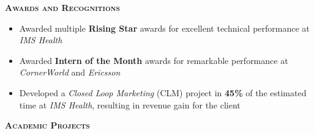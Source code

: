 \documentclass[11pt]{article}
\begin{document}
\begin{mdframed}[backgroundcolor=light-gray, linecolor=light-gray, roundcorner=10pt, shadow=false, shadowsize=1pt]
\Large{\textbf{\textsc{Awards and Recognitions}}}
\end{mdframed}
\begin{itemize}\addtolength{\itemsep}{-0.5\baselineskip}
	\item{Awarded multiple \textbf{Rising Star} awards for excellent technical performance at \textit{IMS Health}}
	\item{Awarded \textbf{Intern of the Month} awards for remarkable performance at \textit{CornerWorld} and \textit{Ericsson}}
	\item{Developed a \textit{Closed Loop Marketing} (CLM) project in \textbf{45\%} of the estimated time at \textit{IMS Health}, resulting in revenue gain for the client}
\end{itemize}
\begin{mdframed}[backgroundcolor=light-gray, linecolor=light-gray, roundcorner=10pt, shadow=false, shadowsize=1pt]
\Large{\textbf{\textsc{Academic Projects}}}
\end{mdframed}
\end{document}
